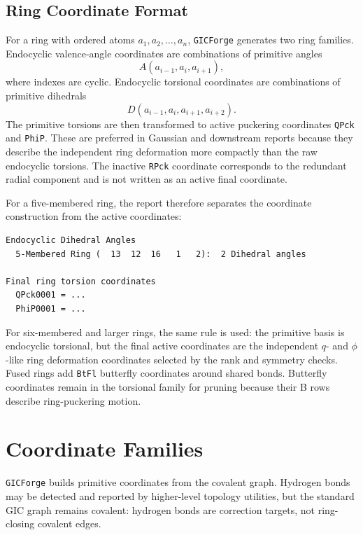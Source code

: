 \documentclass[11pt]{article}
\newcommand{\program}{\texttt{GICForge}}
\begin{document}
\subsection{Ring Coordinate Format}

For a ring with ordered atoms \(a_1,a_2,\ldots,a_n\), \program{} generates two
ring families.  Endocyclic valence-angle coordinates are combinations of
primitive angles
\[
  A(a_{i-1},a_i,a_{i+1}),
\]
where indexes are cyclic.  Endocyclic torsional coordinates are combinations
of primitive dihedrals
\[
  D(a_{i-1},a_i,a_{i+1},a_{i+2}).
\]
The primitive torsions are then transformed to active puckering coordinates
\texttt{QPck} and \texttt{PhiP}.  These are preferred in Gaussian and
downstream reports because they describe the independent ring deformation more
compactly than the raw endocyclic torsions.  The inactive \texttt{RPck}
coordinate corresponds to the redundant radial component and is not written as
an active final coordinate.

For a five-membered ring, the report therefore separates the coordinate
construction from the active coordinates:

\begin{lstlisting}[style=merlino]
Endocyclic Dihedral Angles
  5-Membered Ring (  13  12  16   1   2):  2 Dihedral angles

Final ring torsion coordinates
  QPck0001 = ...
  PhiP0001 = ...
\end{lstlisting}

\noindent
For six-membered and larger rings, the same rule is used: the primitive basis
is endocyclic torsional, but the final active coordinates are the independent
\(q\)- and \(\phi\)-like ring deformation coordinates selected by the rank
and symmetry checks.  Fused rings add \texttt{BtFl} butterfly coordinates around
shared bonds.  Butterfly coordinates remain in the torsional family for
pruning because their B rows describe ring-puckering motion.

\section{Coordinate Families}

\program{} builds primitive coordinates from the covalent graph.  Hydrogen bonds
may be detected and reported by higher-level topology utilities, but the
standard GIC graph remains covalent: hydrogen bonds are correction targets, not
ring-closing covalent edges.
\end{document}
